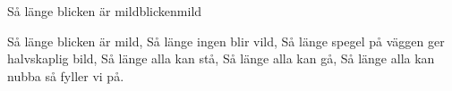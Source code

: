\begin{song}{Så länge blicken är mild}{blickenmild}
\begin{vers}
Så länge blicken är mild,                            
Så länge ingen blir vild, 
Så länge spegel på väggen ger halvskaplig bild, 
Så länge alla kan stå,
Så länge alla kan gå, 
Så länge alla kan nubba så fyller vi på.
\end{vers}
\end{song}
